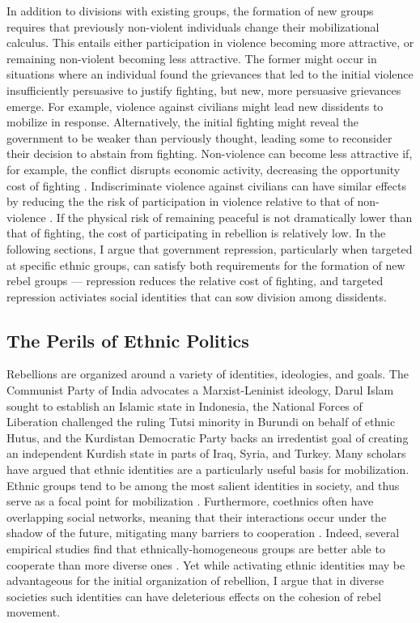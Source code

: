 \documentclass[12pt,]{book}
\begin{document}
In addition to divisions with existing groups, the formation of new
groups requires that previously non-violent individuals change their
mobilizational calculus. This entails either participation in violence
becoming more attractive, or remaining non-violent becoming less
attractive. The former might occur in situations where an individual
found the grievances that led to the initial violence insufficiently
persuasive to justify fighting, but new, more persuasive grievances
emerge. For example, violence against civilians might lead new
dissidents to mobilize in response. Alternatively, the initial fighting
might reveal the government to be weaker than perviously thought,
leading some to reconsider their decision to abstain from fighting.
Non-violence can become less attractive if, for example, the conflict
disrupts economic activity, decreasing the opportunity cost of fighting
\citep[see][]{Collier1998}. Indiscriminate violence against civilians
can have similar effects by reducing the the risk of participation in
violence relative to that of non-violence \citep{Kalyvas2007}. If the
physical risk of remaining peaceful is not dramatically lower than that
of fighting, the cost of participating in rebellion is relatively low.
In the following sections, I argue that government repression,
particularly when targeted at specific ethnic groups, can satisfy both
requirements for the formation of new rebel groups --- repression
reduces the relative cost of fighting, and targeted repression
activiates social identities that can sow division among dissidents.

\subsection{The Perils of Ethnic
Politics}\label{the-perils-of-ethnic-politics}

Rebellions are organized around a variety of identities, ideologies, and
goals. The Communist Party of India advocates a Marxist-Leninist
ideology, Darul Islam sought to establish an Islamic state in Indonesia,
the National Forces of Liberation challenged the ruling Tutsi minority
in Burundi on behalf of ethnic Hutus, and the Kurdistan Democratic Party
backs an irredentist goal of creating an independent Kurdish state in
parts of Iraq, Syria, and Turkey. Many scholars have argued that ethnic
identities are a particularly useful basis for mobilization. Ethnic
groups tend to be among the most salient identities in society, and thus
serve as a focal point for mobilization \citep{Hardin1995, Hechter2001}.
Furthermore, coethnics often have overlapping social networks, meaning
that their interactions occur under the shadow of the future, mitigating
many barriers to cooperation \citep{Habyarimana2012}. Indeed, several
empirical studies find that ethnically-homogeneous groups are better
able to cooperate than more diverse ones
\citep{Alesina1999, Miguel2005, Habyarimana2012}. Yet while activating
ethnic identities may be advantageous for the initial organization of
rebellion, I argue that in diverse societies such identities can have
deleterious effects on the cohesion of rebel movement.
\end{document}
